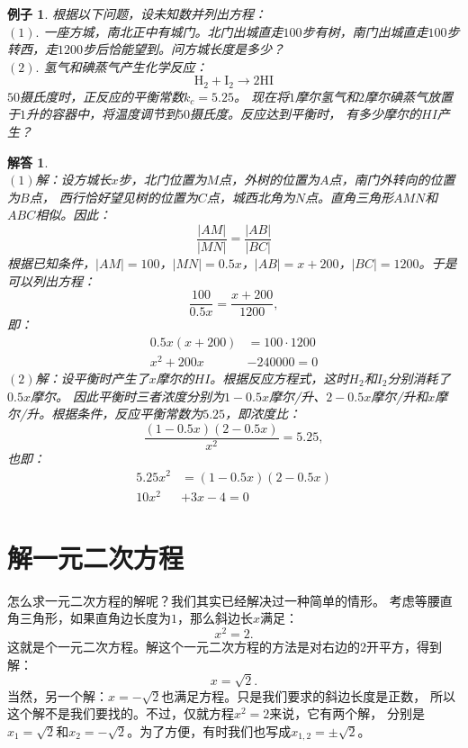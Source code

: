 \documentclass[12pt,UTF8]{ctexbook}
\newtheorem{ex}{例子}[section]
\newtheorem*{so}{解答}
\begin{document}
\begin{ex}\label{ex:4-0-0}
    根据以下问题，设未知数并列出方程：\\
    $(1).$ 一座方城，南北正中有城门。北门出城直走$100$步有树，南门出城直走$100$步转西，走$1200$步后恰能望到。问方城长度是多少？\\
    $(2).$ 氢气和碘蒸气产生化学反应：
    $$\mathrm{H}_2 + \mathrm{I}_2 \longrightarrow 2\mathrm{HI}$$
    $50$摄氏度时，正反应的平衡常数$k_c=5.25$。
    现在将$1$摩尔氢气和$2$摩尔碘蒸气放置于$1$升的容器中，将温度调节到$50$摄氏度。反应达到平衡时，
    有多少摩尔的$HI$产生？
\end{ex}
\begin{so}
    \mbox{} \\
    $(1)$解：设方城长$x$步，北门位置为$M$点，外树的位置为$A$点，南门外转向的位置为$B$点，
    西行恰好望见树的位置为$C$点，城西北角为$N$点。直角三角形$AMN$和$ABC$相似。因此：
    $$ \frac{|AM|}{|MN|} = \frac{|AB|}{|BC|} $$
    根据已知条件，$|AM| = 100$，$|MN| = 0.5x$，$|AB| = x + 200$，$|BC| = 1200$。于是可以列出方程：
    $$ \frac{100}{0.5x} = \frac{x + 200}{1200}, $$
    即：
    \begin{align*}
        0.5x(x + 200) &= 100 \cdot 1200  \\
        x^2 + 200x &- 240000 = 0  
    \end{align*} 
    $(2)$解：设平衡时产生了$x$摩尔的$HI$。根据反应方程式，这时$H_2$和$I_2$分别消耗了$0.5x$摩尔。
    因此平衡时三者浓度分别为$1 - 0.5x$摩尔/升、$2 - 0.5x$摩尔/升和$x$摩尔/升。根据条件，反应平衡常数为$5.25$，即浓度比：
    $$ \frac{(1 - 0.5x)(2 - 0.5x)}{x^2} = 5.25,$$
    也即：
    \begin{align*}
        5.25 x^2 &= \left(1 - 0.5x\right)\left(2 - 0.5x\right)  \\
        10 x^2 &+ 3x - 4 = 0 
    \end{align*} 
\end{so}

\section{解一元二次方程}
怎么求一元二次方程的解呢？我们其实已经解决过一种简单的情形。
考虑等腰直角三角形，如果直角边长度为$1$，那么斜边长$x$满足：
$$x^2 = 2.$$
这就是个一元二次方程。解这个一元二次方程的方法是对右边的$2$开平方，得到解：
$$ x = \sqrt{2}.$$
当然，另一个解：$x = -\sqrt{2}$也满足方程。只是我们要求的斜边长度是正数，
所以这个解不是我们要找的。不过，仅就方程$ x^2 = 2$来说，它有两个解，
分别是$x_1 = \sqrt{2}$和$x_2 = -\sqrt{2}$。为了方便，有时我们也写成$x_{1,2} = \pm\sqrt{2}$。
\end{document}
